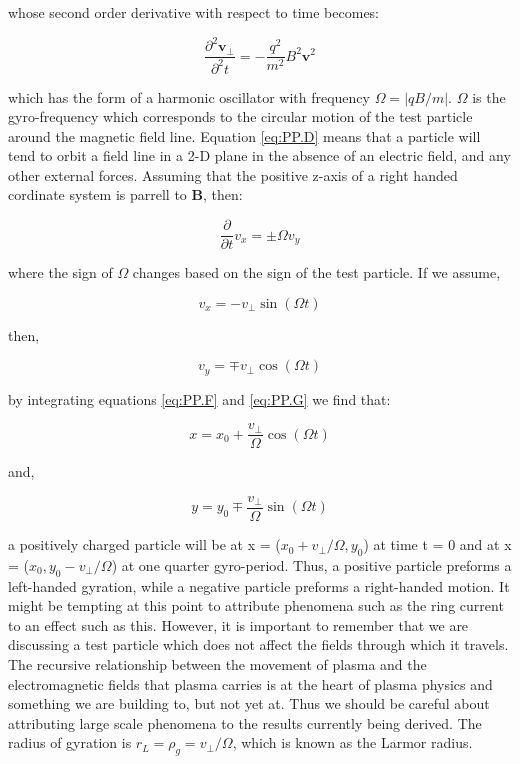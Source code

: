 \documentclass[utf8]{report}
\begin{document}
whose second order derivative with respect to time becomes: 

\begin{equation}
    \frac{\partial^{2} \textbf{v}_{\perp}}{\partial^{2} t} = - \frac{q^{2}}{m^{2}} B^{2} \textbf{v}^{2}
    \label{eq:PP.D}
\end{equation}

which has the form of a harmonic oscillator with frequency $\Omega = |qB/m|$. $\Omega$ is the gyro-frequency which corresponds to the circular motion of the test particle around the magnetic field line. Equation \ref{eq:PP.D} means that a particle will tend to orbit a field line in a 2-D plane in the absence of an electric field, and any other external forces. Assuming that the positive z-axis of a right handed cordinate system is parrell to \textbf{B}, then: 

\begin{equation}
    \frac{\partial }{\partial t} v_{x} = \pm \Omega v_{y}
    \label{eq:PP.E}
\end{equation}

where the sign of $\Omega$ changes based on the sign of the test particle. If we assume, 

\begin{equation}
    v_{x} = - v_{\perp} \sin(\Omega t) 
    \label{eq:PP.F}
\end{equation}

then, 

\begin{equation}
    v_{y} = \mp v_{\perp} \cos(\Omega t) 
    \label{eq:PP.G}
\end{equation}

by integrating equations \ref{eq:PP.F} and \ref{eq:PP.G} we find that: 

\begin{equation}
    x = x_{0} + \frac{v_{\perp}}{\Omega} \cos(\Omega t)
    \label{eq:PP.H}
\end{equation}

and, 

\begin{equation}
    y = y_{0} \mp \frac{v_{\perp}}{\Omega} \sin(\Omega t)
    \label{eq:PP.I}
\end{equation}

a positively charged particle will be at x = ($x_{0} + v_{\perp}/\Omega, y_{0}$) at time t = 0 and at x = ($x_{0}, y_{0} - v_{\perp}/\Omega$) at one quarter gyro-period. Thus, a positive particle preforms a left-handed gyration, while a negative particle preforms a right-handed motion. It might be tempting at this point to attribute phenomena such as the ring current to an effect such as this. However, it is important to remember that we are discussing a test particle which does not affect the fields through which it travels. The recursive relationship between the movement of plasma and the electromagnetic fields that plasma carries is at the heart of plasma physics and something we are building to, but not yet at. Thus we should be careful about attributing large scale phenomena to the results currently being derived. The radius of gyration is $r_{L} = \rho_{g} = v_{\perp} / \Omega$, which is known as the Larmor radius. 
\end{document}
